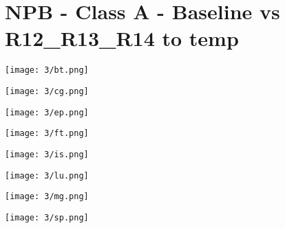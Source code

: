 \documentclass[11pt]{article}
\begin{document}
\section*{NPB - Class A - Baseline vs R12\_R13\_R14 to temp}

\texttt{[image: 3/bt.png]}\par\vspace{0,5cm}
\texttt{[image: 3/cg.png]}\par\vspace{0,5cm}
\texttt{[image: 3/ep.png]}\par\vspace{0,5cm}
\texttt{[image: 3/ft.png]}\par\vspace{0,5cm}
\texttt{[image: 3/is.png]}\par\vspace{0,5cm}
\texttt{[image: 3/lu.png]}\par\vspace{0,5cm}
\texttt{[image: 3/mg.png]}\par\vspace{0,5cm}
\texttt{[image: 3/sp.png]}\par\vspace{0,5cm}
\end{document}
